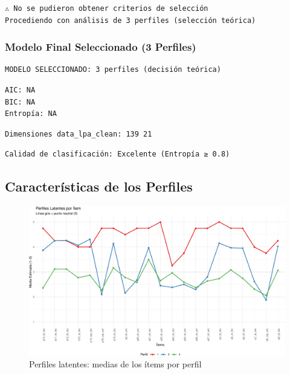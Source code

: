 \documentclass[
  11pt,
  letterpaper,
  DIV=11,
  numbers=noendperiod]{scrartcl}
\begin{document}
\begin{verbatim}
⚠ No se pudieron obtener criterios de selección
Procediendo con análisis de 3 perfiles (selección teórica)
\end{verbatim}

\subsubsection{Modelo Final Seleccionado (3
Perfiles)}\label{modelo-final-seleccionado-3-perfiles}

\begin{verbatim}
MODELO SELECCIONADO: 3 perfiles (decisión teórica)
\end{verbatim}

\begin{verbatim}
AIC: NA 
BIC: NA 
Entropía: NA 
\end{verbatim}

\begin{verbatim}
Dimensiones data_lpa_clean: 139 21 
\end{verbatim}

\begin{verbatim}
Calidad de clasificación: Excelente (Entropía ≥ 0.8)
\end{verbatim}

\newpage

\subsection{Características de los
Perfiles}\label{caracteruxedsticas-de-los-perfiles}

\begin{figure}[H]

{\centering \includegraphics[width=1\linewidth,height=\textheight,keepaspectratio]{analisis_perfiles_latentes_pdf_files/figure-pdf/profile-characteristics-1.pdf}

}

\caption{Perfiles latentes: medias de los ítems por perfil}

\end{figure}%
\end{document}
